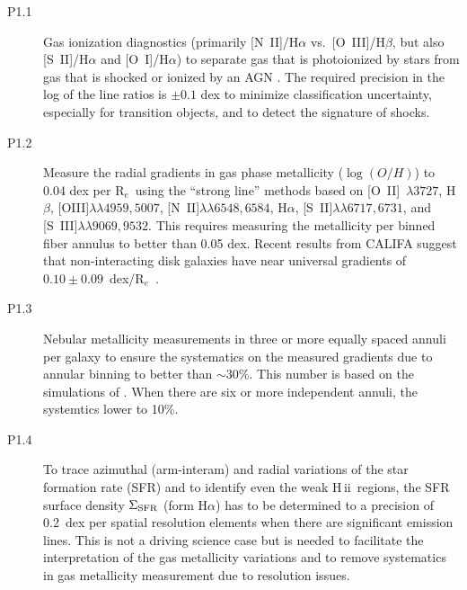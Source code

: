 \documentclass[preprint,11pt]{aastex}
\newcommand{\Reff}{{R$_{e}$}}
\newcommand{\HII}{{\sc H\,ii}}
\begin{document}
\begin{description}

\item[P1.1] Gas ionization diagnostics (primarily [N~II]/H$\alpha$
  vs.\ [O~III]/H$\beta$, but also [S~II]/H$\alpha$ and [O~I]/H$\alpha$)
  to separate gas that is photoionized by stars from gas that is
  shocked or ionized by an AGN \citep{baldwin81, kauffmann03} . The
  required precision in the log of the line ratios is $\pm0.1$ dex to
  minimize classification uncertainty, especially for transition
  objects, and to detect the signature of shocks.

\item[P1.2] Measure the radial gradients in gas phase metallicity ($\log (O/H)$) to 0.04 dex per \Reff\ using the ``strong line'' methods \citep{kewley02,
  tremonti04} based on [O~II]~$\lambda3727$, H$\beta$,
  [OIII]$\lambda\lambda4959,5007$, [N~II]$\lambda\lambda6548,6584$,
  H$\alpha$, [S~II]$\lambda\lambda 6717,6731$, and
  [S~III]$\lambda\lambda 9069,9532$. This requires measuring the metallicity per binned fiber annulus to better than 0.05 dex.  %
  Recent results from CALIFA suggest that non-interacting disk galaxies
  have near universal gradients of $0.10\pm0.09$~dex/\Reff\ \citep{sanchez13}. 

\item[P1.3] Nebular metallicity measurements in three or more equally
  spaced annuli per galaxy to ensure the systematics on the measured 
  gradients due to annular binning to better than $\sim30$\%. %
  This number is based on the simulations of \citet{yuan13}. When there are six
  or more independent annuli, the systemtics lower to 10\%.


\item[P1.4] To trace azimuthal (arm-interam) and radial variations of
  the star formation rate (SFR) and to identify even the weak \HII\
  regions, the SFR surface density $\rm \Sigma _{SFR}$ (form
  H$\alpha$) has to be determined to a precision of 0.2~dex per
  spatial resolution elements when there are significant emission
  lines.  This is not a driving science case but is needed to
  facilitate the interpretation of the gas metallicity variations and
  to remove systematics in gas metallicity measurement due to
  resolution issues.
 

\end{description}
\end{document}
